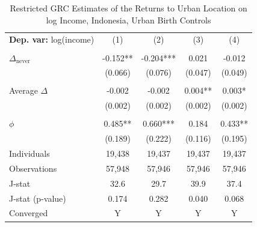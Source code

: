 \begin{table}[htbp] \centering \begin{threeparttable}
 \caption{Restricted GRC Estimates of the Returns to Urban Location on log Income, Indonesia, Urban Birth Controls} 
 \label{tab:GRC_IDN_income_urban_unb_birth} 
\begin{tabular}{l cccc} \toprule  \textbf{Dep. var:}  log(income) 
                    &\multicolumn{1}{c}{(1)}   &\multicolumn{1}{c}{(2)}   &\multicolumn{1}{c}{(3)}   &\multicolumn{1}{c}{(4)}   \\
                    &               &               &               &               \\
\addlinespace
$\Delta_{\text{never}}$&      -0.152** &      -0.204***&       0.021   &      -0.012   \\
                    &     (0.066)   &     (0.076)   &     (0.047)   &     (0.049)   \\
                    &               &               &               &               \\
\addlinespace
Average $\Delta$    &      -0.002   &      -0.002   &       0.004** &       0.003*  \\
                    &     (0.002)   &     (0.002)   &     (0.002)   &     (0.002)   \\
                    &               &               &               &               \\
\addlinespace
$\phi$              &       0.485** &       0.660***&       0.184   &       0.433** \\
                    &     (0.189)   &     (0.222)   &     (0.116)   &     (0.195)   \\
\addlinespace
Individuals         &      19,438   &      19,437   &      19,437   &      19,437   \\
Observations        &      57,948   &      57,946   &      57,946   &      57,946   \\
J-stat              &        32.6   &        29.7   &        39.9   &        37.4   \\
J-stat (p-value)    &       0.174   &       0.282   &       0.040   &       0.068   \\
Converged           &           Y   &           Y   &           Y   &           Y   \\

\end{tabular}
\end{threeparttable}
\end{table}
